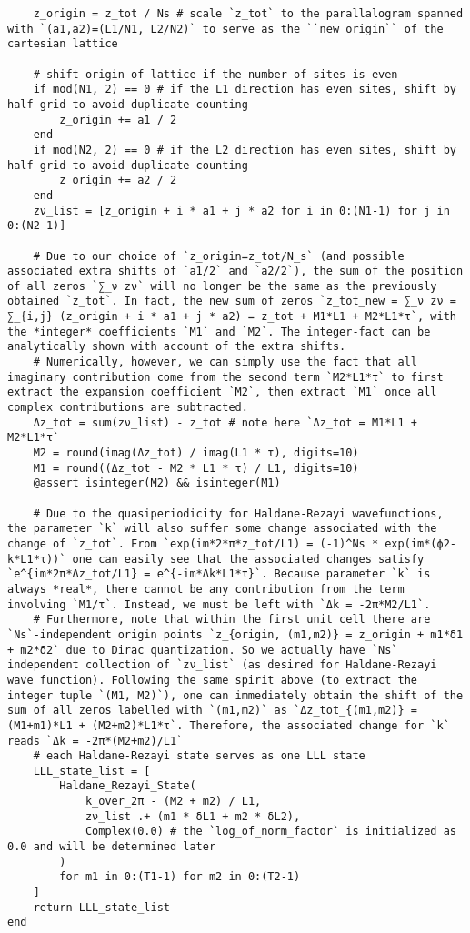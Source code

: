 \begin{verbatim}
    z_origin = z_tot / Ns # scale `z_tot` to the parallalogram spanned with `(a1,a2)=(L1/N1, L2/N2)` to serve as the ``new origin`` of the cartesian lattice

    # shift origin of lattice if the number of sites is even
    if mod(N1, 2) == 0 # if the L1 direction has even sites, shift by half grid to avoid duplicate counting
        z_origin += a1 / 2
    end
    if mod(N2, 2) == 0 # if the L2 direction has even sites, shift by half grid to avoid duplicate counting
        z_origin += a2 / 2
    end
    zν_list = [z_origin + i * a1 + j * a2 for i in 0:(N1-1) for j in 0:(N2-1)]

    # Due to our choice of `z_origin=z_tot/N_s` (and possible associated extra shifts of `a1/2` and `a2/2`), the sum of the position of all zeros `∑_ν zν` will no longer be the same as the previously obtained `z_tot`. In fact, the new sum of zeros `z_tot_new = ∑_ν zν = ∑_{i,j} (z_origin + i * a1 + j * a2) = z_tot + M1*L1 + M2*L1*τ`, with the *integer* coefficients `M1` and `M2`. The integer-fact can be analytically shown with account of the extra shifts. 
    # Numerically, however, we can simply use the fact that all imaginary contribution come from the second term `M2*L1*τ` to first extract the expansion coefficient `M2`, then extract `M1` once all complex contributions are subtracted.
    Δz_tot = sum(zν_list) - z_tot # note here `Δz_tot = M1*L1 + M2*L1*τ` 
    M2 = round(imag(Δz_tot) / imag(L1 * τ), digits=10)
    M1 = round((Δz_tot - M2 * L1 * τ) / L1, digits=10)
    @assert isinteger(M2) && isinteger(M1)

    # Due to the quasiperiodicity for Haldane-Rezayi wavefunctions, the parameter `k` will also suffer some change associated with the change of `z_tot`. From `exp(im*2*π*z_tot/L1) = (-1)^Ns * exp(im*(ϕ2-k*L1*τ))` one can easily see that the associated changes satisfy `e^{im*2π*Δz_tot/L1} = e^{-im*Δk*L1*τ}`. Because parameter `k` is always *real*, there cannot be any contribution from the term involving `M1/τ`. Instead, we must be left with `Δk = -2π*M2/L1`.
    # Furthermore, note that within the first unit cell there are `Ns`-independent origin points `z_{origin, (m1,m2)} = z_origin + m1*δ1 + m2*δ2` due to Dirac quantization. So we actually have `Ns` independent collection of `zν_list` (as desired for Haldane-Rezayi wave function). Following the same spirit above (to extract the integer tuple `(M1, M2)`), one can immediately obtain the shift of the sum of all zeros labelled with `(m1,m2)` as `Δz_tot_{(m1,m2)} = (M1+m1)*L1 + (M2+m2)*L1*τ`. Therefore, the associated change for `k` reads `Δk = -2π*(M2+m2)/L1`
    # each Haldane-Rezayi state serves as one LLL state
    LLL_state_list = [
        Haldane_Rezayi_State(
            k_over_2π - (M2 + m2) / L1,
            zν_list .+ (m1 * δL1 + m2 * δL2),
            Complex(0.0) # the `log_of_norm_factor` is initialized as 0.0 and will be determined later
        )
        for m1 in 0:(T1-1) for m2 in 0:(T2-1)
    ]
    return LLL_state_list
end




\end{verbatim}
